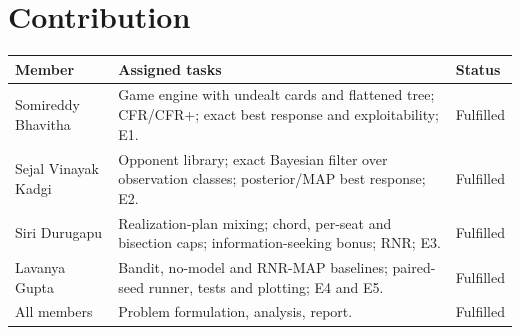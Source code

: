 \documentclass[11pt]{article}
\begin{document}
\section{Contribution}
\begin{center}\small
\begin{tabularx}{\linewidth}{@{}l X l@{}}\toprule
Member & Assigned tasks & Status\\\midrule
Somireddy Bhavitha & Game engine with undealt cards and flattened tree; CFR/CFR+; exact best response and exploitability; E1. & Fulfilled\\
Sejal Vinayak Kadgi & Opponent library; exact Bayesian filter over observation classes; posterior/MAP best response; E2. & Fulfilled\\
Siri Durugapu & Realization-plan mixing; chord, per-seat and bisection caps; information-seeking bonus; RNR; E3. & Fulfilled\\
Lavanya Gupta & Bandit, no-model and RNR-MAP baselines; paired-seed runner, tests and plotting; E4 and E5. & Fulfilled\\
All members & Problem formulation, analysis, report. & Fulfilled\\\bottomrule
\end{tabularx}\end{center}
\end{document}
